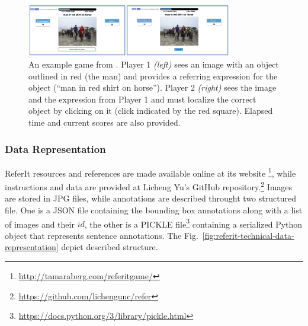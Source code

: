 \begin{figure}
  \centering
  \includegraphics[width=0.8\textwidth]{figures/referitgame-example.png}
  \caption[ReferIt Game Example.]{An example game from
  \cite{kazemzadeh2014referitgame}. Player 1 \textit{(left)} sees an
  image with an object outlined in red (the man) and provides a
  referring expression for the object (``man in red shirt on horse'').
  Player 2 \textit{(right)} sees the image and the expression from
  Player 1 and must localize the correct object by clicking on it
  (click indicated by the red square). Elapsed time and current scores
  are also provided. }
  \label{fig:referitgame-example}
\end{figure}

\subsubsection{Data Representation}
\label{subsec:referit-data-representation}

ReferIt resources and references are made available online at its
website
\footnote{\href{http://tamaraberg.com/referitgame/}{http://tamaraberg.com/referitgame/}},
while instructions and data are provided at Licheng Yu's GitHub
repository.\footnote{\href{https://github.com/lichengunc/refer}{https://github.com/lichengunc/refer}}
Images are stored in JPG files, while annotations are described
throught two structured file. One is a JSON file containing the
bounding box annotations along with a list of images and their $id$,
the other is a PICKLE
file\footnote{\href{https://docs.python.org/3/library/pickle.html}{https://docs.python.org/3/library/pickle.html}}
containing a serialized Python object that represents sentence
annotations. The Fig.~\ref{fig:referit-technical-data-representation}
depict described structure.

